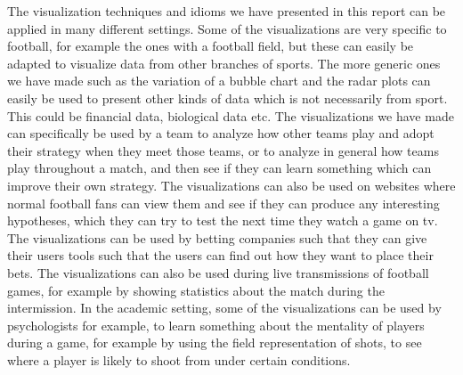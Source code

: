 \documentclass[Report.tex]{subfiles}
\begin{document}
The visualization techniques and idioms we have presented in this report can be applied in many different settings. Some of the visualizations
are very specific to football, for example the ones with a football field, but these can easily be adapted to visualize data from other branches
of sports. The more generic ones we have made such as the variation of a bubble chart and the radar plots can easily be used to present other
kinds of data which is not necessarily from sport. This could be financial data, biological data etc.
The visualizations we have made can specifically be used by a team to analyze how other teams play
and adopt their strategy when they meet those teams, or to analyze in general how teams play throughout a match, and then see if they can learn
something which can improve their own strategy. The visualizations can also be used on websites where normal football fans can view them and see if they can produce any interesting hypotheses, which they can try to test the next time they watch a game on tv. The visualizations can be used by betting companies such that they can give their users tools such that the users can find out how they want to place their bets. The visualizations can also be used during live transmissions of football games, for example by showing statistics about the match during the intermission. In the academic setting, some of the visualizations can be used by psychologists for example, to learn something about the mentality of players during a game, for example by using the field representation of shots, to see where a player is likely to shoot from under certain conditions.
\end{document}
